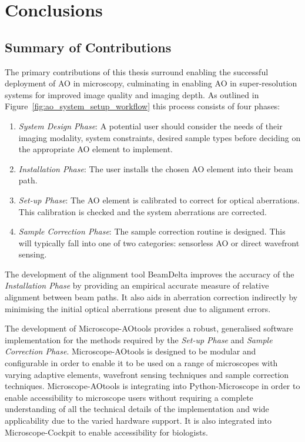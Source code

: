 \chapter{Conclusions}
\label{chpt:conclusions}

\section{Summary of Contributions}
\label{sec:contributions}

The primary contributions of this thesis surround enabling the successful 
deployment of AO in microscopy, culminating in enabling AO in 
super-resolution systems for improved image quality and imaging depth. As 
outlined in Figure~\ref{fig:ao_system_setup_workflow} this process consists 
of four phases:

\begin{enumerate}
	\item \textit{System Design Phase}: A potential user should consider 
	the needs of their imaging modality, system constraints, desired 
	sample types before deciding on the appropriate AO element to 
	implement.
	\item \textit{Installation Phase}: The user installs the chosen AO 
	element into their beam path.
	\item \textit{Set-up Phase}: The AO element is calibrated to correct 
	for optical aberrations. This calibration is checked and the system 
	aberrations are corrected.
	\item \textit{Sample Correction Phase}: The sample correction routine 
	is designed. This will typically fall into one of two categories: 
	sensorless AO or direct wavefront sensing.
\end{enumerate}  

The development of the alignment tool BeamDelta improves the accuracy of the 
\textit{Installation Phase} by providing an empirical accurate measure of 
relative alignment between beam paths\cite{dobbie2019beamdelta}. It also aids 
in aberration correction indirectly by minimising the initial optical 
aberrations present due to alignment errors.

The development of Microscope-AOtools provides a robust, generalised 
software implementation for the methods required by the \textit{Set-up Phase} 
and \textit{Sample Correction Phase}\cite{hall2020microscope}. 
Microscope-AOtools is designed to be modular and configurable in order to 
enable it to be used on a range of microscopes with varying adaptive 
elements, wavefront sensing techniques and sample correction techniques. 
Microscope-AOtools is integrating into Python-Microscope in order to enable 
accessibility to microscope users without requiring a complete understanding 
of all the technical details of the implementation and wide
applicability due to the varied hardware support. It is also integrated into Microscope-Cockpit to enable accessibility for biologists.

